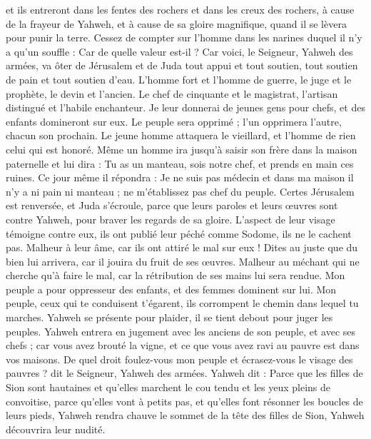 \begin{multicols}{2}
et ils entreront dans les fentes des rochers et dans les creux des rochers, à cause de la frayeur de Yahweh, et à cause de sa gloire magnifique, quand il se lèvera pour punir la terre.
Cessez de compter sur l'homme dans les narines duquel il n’y a qu’un souffle : Car de quelle valeur est-il ?
\VerseOne{}Car voici, le Seigneur, Yahweh des armées, va ôter de Jérusalem et de Juda tout appui et tout soutien, tout soutien de pain et tout soutien d'eau.
L'homme fort et l'homme de guerre, le juge et le prophète, le devin et l'ancien.
Le chef de cinquante et le magistrat, l’artisan distingué et l’habile enchanteur.
Je leur donnerai de jeunes gens pour chefs, et des enfants domineront sur eux.
Le peuple sera opprimé ; l’un opprimera l'autre, chacun son prochain. Le jeune homme attaquera le vieillard, et l'homme de rien celui qui est honoré.
Même un homme ira jusqu’à saisir son frère dans la maison paternelle et lui dira : Tu as un manteau, sois notre chef, et prends en main ces ruines.
Ce jour même il répondra : Je ne suis pas médecin et dans ma maison il n'y a ni pain ni manteau ; ne m’établissez pas chef du peuple.
Certes Jérusalem est renversée, et Juda s’écroule, parce que leurs paroles et leurs œuvres sont contre Yahweh, pour braver les regards de sa gloire.
L’aspect de leur visage témoigne contre eux, ils ont publié leur péché comme Sodome, ils ne le cachent pas. Malheur à leur âme, car ils ont attiré le mal sur eux !
Dites au juste que du bien lui arrivera, car il jouira du fruit de ses œuvres.
Malheur au méchant qui ne cherche qu'à faire le mal, car la rétribution de ses mains lui sera rendue.
Mon peuple a pour oppresseur des enfants, et des femmes dominent sur lui. Mon peuple, ceux qui te conduisent t’égarent, ils corrompent le chemin dans lequel tu marches.
Yahweh se présente pour plaider, il se tient debout pour juger les peuples.
Yahweh entrera en jugement avec les anciens de son peuple, et avec ses chefs ; car vous avez brouté la vigne, et ce que vous avez ravi au pauvre est dans vos maisons.
De quel droit foulez-vous mon peuple et écrasez-vous le visage des pauvres ? dit le Seigneur, Yahweh des armées.
Yahweh dit : Parce que les filles de Sion sont hautaines et qu’elles marchent le cou tendu et les yeux pleins de convoitise, parce qu’elles vont à petits pas, et qu’elles font résonner les boucles de leurs pieds,
Yahweh rendra chauve le sommet de la tête des filles de Sion, Yahweh découvrira leur nudité.

\end{multicols}
